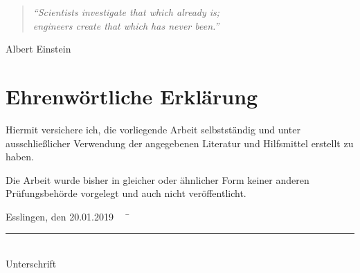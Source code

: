 \thispagestyle{empty}
\vspace*{2cm}
\begin{center}
    \begin{minipage}{12cm}
        \begin{center}
        \end{center}
    \end{minipage}

    \vfill{}

    \begin{minipage}{10cm}
        \begin{quote}
            \textit{``Scientists investigate that which already is;\\ engineers create that which has never been.''}
        \end{quote}
        \hfill Albert Einstein
    \end{minipage}
\end{center}

\chapter*{Ehrenwörtliche Erklärung}
\thispagestyle{empty}
Hiermit versichere ich, die vorliegende Arbeit selbstständig und unter ausschließlicher Verwendung der angegebenen
Literatur und Hilfsmittel erstellt zu haben.

Die Arbeit wurde bisher in gleicher oder ähnlicher Form keiner anderen Prüfungsbehörde vorgelegt und auch nicht
veröffentlicht.

\begin{tabbing}
          Esslingen, den 20.01.2019 ~~	\= \rule{6cm}{0.3mm}\\ \> Unterschrift
\end{tabbing}





\frontmatter

\tableofcontents


